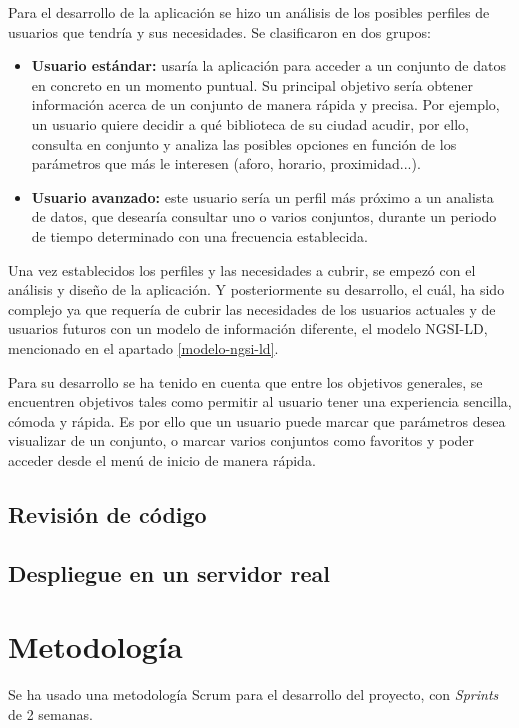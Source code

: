 Para el desarrollo de la aplicación se hizo un análisis de los posibles perfiles de usuarios que tendría y sus necesidades. Se clasificaron en dos grupos:

\begin{itemize}
    \item \textbf{Usuario estándar:} usaría la aplicación para acceder a un conjunto de datos en concreto en un momento puntual. Su principal objetivo sería obtener información acerca de un conjunto de manera rápida y precisa. Por ejemplo, un usuario quiere decidir a qué biblioteca de su ciudad acudir, por ello, consulta en conjunto y analiza las posibles opciones en función de los parámetros que más le interesen (aforo, horario, proximidad...).
    \item \textbf{Usuario avanzado:} este usuario sería un perfil más próximo a un analista de datos, que desearía consultar uno o varios conjuntos, durante un periodo de tiempo determinado con una frecuencia establecida.
\end{itemize}

Una vez establecidos los perfiles y las necesidades a cubrir, se empezó con el análisis y diseño de la aplicación. Y posteriormente su desarrollo, el cuál, ha sido complejo ya que requería de cubrir las necesidades de los usuarios actuales y de usuarios futuros con un modelo de información diferente, el modelo NGSI-LD, mencionado en el apartado \ref{modelo-ngsi-ld}.

Para su desarrollo se ha tenido en cuenta que entre los objetivos generales, se encuentren objetivos tales como permitir al usuario tener una experiencia sencilla, cómoda y rápida. Es por ello que un usuario puede marcar que parámetros desea visualizar de un conjunto, o marcar varios conjuntos como favoritos y poder acceder desde el menú de inicio de manera rápida.


\subsection{Revisión de código}


\subsection{Despliegue en un servidor real}



\section{Metodología}
Se ha usado una metodología Scrum para el desarrollo del proyecto, con \textit{Sprints} de 2 semanas.

